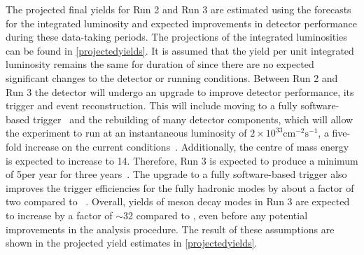 The projected final yields for Run 2 and Run 3 are estimated using the forecasts for the integrated luminosity and expected improvements in detector performance during these data-taking periods. The projections of the integrated luminosities can be found in \tab\ref{projectedyields}. It is assumed that the yield per unit integrated luminosity remains the same for duration of \runtwo since there are no expected significant changes to the detector or running conditions. Between Run 2 and Run 3 the detector will undergo an upgrade to improve detector performance, its trigger and event reconstruction. This will include moving to a fully software-based trigger~\cite{CERN-LHCC-2014-016} and the rebuilding of many detector components, which will allow the experiment to run at an instantaneous luminosity of $2 \times 10^{33} \text{cm}^{-2}\text{s}^{-1}$, a five-fold increase on the current conditions~\cite{CERN-LHCC-2014-016}. Additionally, the centre of mass energy is expected to increase to 14\tev. Therefore, Run 3 is expected to produce a minimum of 5\invfb per year for three years~\cite{CERN-LHCC-2014-016}. The upgrade to a fully software-based trigger also improves the trigger efficiencies for the fully hadronic modes by about a factor of two compared to \runone~\cite{CERN-LHCC-2014-016}. Overall, yields of \B meson decay modes in Run 3 are expected to increase by a factor of $\sim$32 compared to \runone, even before any potential improvements in the analysis procedure. The result of these assumptions are shown in the projected yield estimates in \tab\ref{projectedyields}.

\begin{table}
\caption{Yields and projected yields for the data-taking periods of the LHC. The entries in bold are projected yields, whereas the other entries refer to data used in this thesis. Projected results are justified in the text, with information taken from Ref.~\cite{CERN-LHCC-2014-016}.}
\label{projectedyields}
\end{table}

